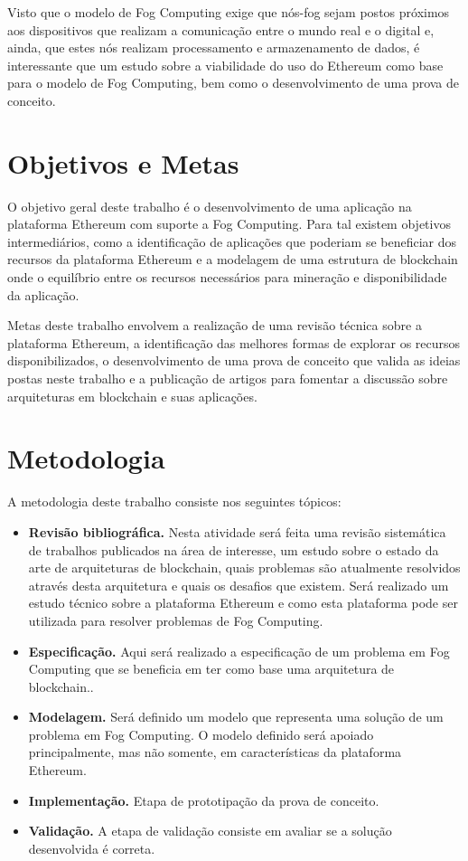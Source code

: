 \documentclass[tcc-proposta]{texufpel}
\begin{document}
Visto que o modelo de Fog Computing exige que nós-fog sejam postos próximos aos dispositivos que realizam a comunicação entre o mundo real e o digital e, ainda, que estes nós realizam processamento e armazenamento de dados, é interessante que um estudo sobre a viabilidade do uso do Ethereum como base para o modelo de Fog Computing, bem como o desenvolvimento de uma prova de conceito.
	
\chapter{Objetivos e Metas}

O objetivo geral deste trabalho é o desenvolvimento de uma aplicação na plataforma Ethereum com suporte a Fog Computing. Para tal existem objetivos intermediários, como a identificação de aplicações que poderiam se beneficiar dos recursos da plataforma Ethereum e a modelagem de uma estrutura de blockchain onde o equilíbrio entre os recursos necessários para mineração e disponibilidade da aplicação.

Metas deste trabalho envolvem a realização de uma revisão técnica sobre a plataforma Ethereum, a identificação das melhores formas de explorar os recursos disponibilizados, o desenvolvimento de uma prova de conceito que valida as ideias postas neste trabalho e a publicação de artigos para fomentar a discussão sobre arquiteturas em blockchain e suas aplicações.
	
\chapter{Metodologia}
A metodologia deste trabalho consiste nos seguintes tópicos:
	
\begin{itemize}
	\item \textbf{Revisão bibliográfica.} Nesta atividade será feita uma revisão sistemática de trabalhos publicados na área de interesse, um estudo sobre o estado da arte de arquiteturas de blockchain, quais problemas são atualmente resolvidos através desta arquitetura e quais os desafios que existem. Será realizado um estudo técnico sobre a plataforma Ethereum e como esta plataforma pode ser utilizada para resolver problemas de Fog Computing.
	
	\item \textbf{Especificação.} Aqui será realizado a especificação de um problema em Fog Computing que se beneficia em ter como base uma arquitetura de blockchain..
	
	\item \textbf{Modelagem.} Será definido um modelo que representa uma solução de um problema em Fog Computing. O modelo definido será apoiado principalmente, mas não somente, em características da plataforma Ethereum.
	
	\item \textbf{Implementação.} Etapa de prototipação da prova de conceito. 
	
	\item \textbf{Validação.} A etapa de validação consiste em avaliar se a solução desenvolvida é correta.
\end{itemize}
	
\end{document}

